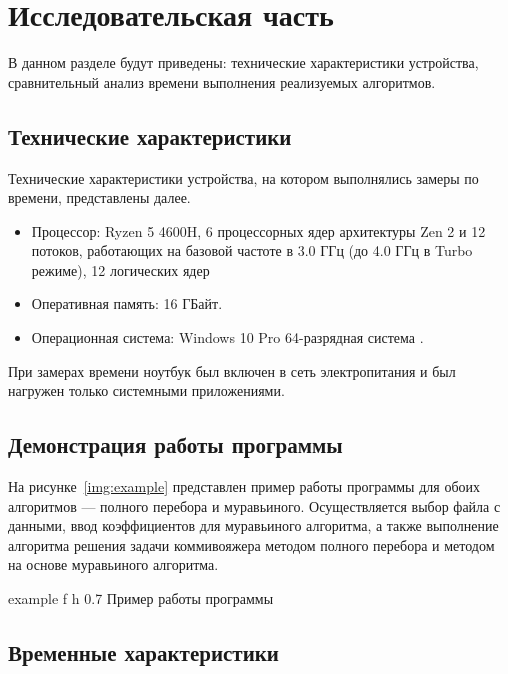 \chapter{Исследовательская часть}

В данном разделе будут приведены: технические характеристики устройства, сравнительный анализ времени выполнения реализуемых алгоритмов.

\section{Технические характеристики}

Технические характеристики устройства, на котором выполнялись замеры по времени, представлены далее.

\begin{itemize}
	\item Процессор: Ryzen 5 4600H, 6 процессорных ядер архитектуры Zen 2 и 12 потоков, работающих на базовой частоте в 3.0 ГГц (до 4.0 ГГц в Turbo режиме), 12 логических ядер~\cite{ryzen}
	\item Оперативная память: 16 ГБайт.
	\item Операционная система: Windows 10 Pro 64-разрядная система \cite{windows}.
\end{itemize}

При замерах времени ноутбук был включен в сеть электропитания и был нагружен только системными приложениями.


\section{Демонстрация работы программы}

На рисунке~\ref{img:example}  представлен пример работы программы для обоих алгоритмов --- полного перебора и муравьиного.
Осуществляется выбор файла с данными, ввод коэффициентов для муравьиного алгоритма, а также выполнение алгоритма решения задачи коммивояжера методом полного перебора и методом на основе муравьиного алгоритма.

\clearpage

{example} %
{f} %
{h} %
{0.7\textwidth} %
{Пример работы программы} %


\section{Временные характеристики}

